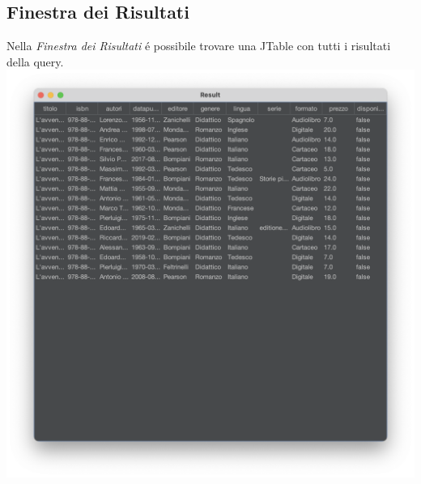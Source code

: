  \subsection{Finestra dei Risultati}
 Nella \textit{Finestra dei Risultati} \'e possibile trovare una JTable con tutti i risultati della query.
 \\
 \includegraphics[scale=0.25, center]{Immagini/Schermate/Search/ResultPage.png}

